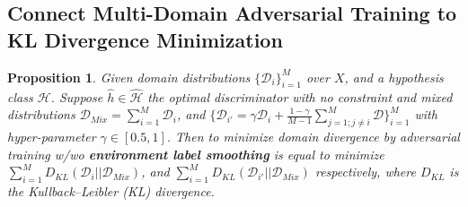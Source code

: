 \documentclass{article} \usepackage{iclr2023_conference,times}
\newtheorem{prop}{Proposition}
\newcommand{\D}{\mathcal{D}}
\begin{document}
\subsection{Connect Multi-Domain Adversarial Training to KL Divergence Minimization}\label{sec:ms_ls}
\begin{prop}
Given domain distributions $\{\D_i\}_{i=1}^M$ over $X$, and a hypothesis class $\mathcal{H}$. Suppose $\hat{h}\in\hat{\mathcal{H}}$ the optimal discriminator with no constraint and mixed distributions $\D_{Mix}=\sum_{i=1}^M \D_i$, and $\{\D_{i'}=\gamma \D_i+\frac{1-\gamma}{M-1}\sum^M_{j=1;j\neq i}\D\}_{i=1}^M$ with hyper-parameter $\gamma\in[0.5,1]$. Then to minimize domain divergence by adversarial training w/wo \textbf{environment label smoothing} is equal to minimize $\sum_{i=1}^M D_{KL}(\D_i||\D_{Mix})$, and $\sum_{i=1}^M D_{KL}(\D_{i'}||\D_{Mix})$ respectively, where $D_{KL}$ is the Kullback–Leibler (KL) divergence.
\label{prop3}
\end{prop}
\end{document}
